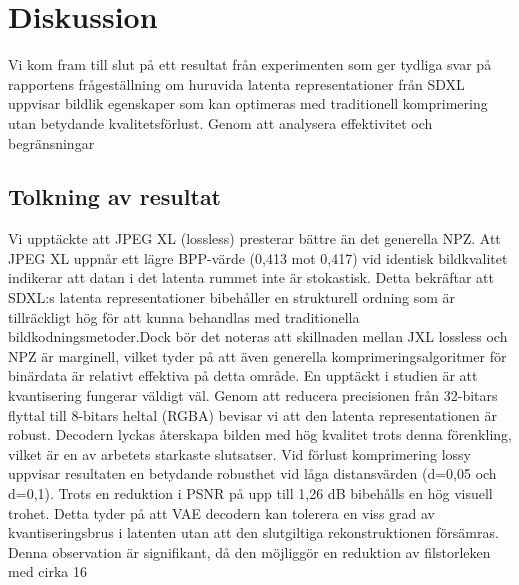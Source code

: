 \section*{Diskussion}




Vi kom fram till slut på ett resultat från experimenten som ger tydliga svar på rapportens frågeställning om huruvida latenta representationer från SDXL uppvisar bildlik egenskaper som kan optimeras med traditionell komprimering utan betydande kvalitetsförlust. Genom att analysera effektivitet och begränsningar


\subsection*{Tolkning av resultat }
Vi upptäckte att JPEG XL (lossless) presterar bättre än det generella NPZ. Att JPEG XL uppnår ett lägre BPP-värde (0,413 mot 0,417) vid identisk bildkvalitet indikerar att datan i det latenta rummet inte är stokastisk. Detta bekräftar att SDXL:s latenta representationer bibehåller en strukturell ordning som är tillräckligt hög för att kunna behandlas med traditionella bildkodningsmetoder.Dock bör det noteras att skillnaden mellan JXL lossless och NPZ är marginell, vilket tyder på att även generella komprimeringsalgoritmer för binärdata är relativt effektiva på detta område.
En upptäckt i studien är att kvantisering fungerar väldigt väl. Genom att reducera precisionen från 32-bitars flyttal till 8-bitars heltal (RGBA) bevisar vi att den latenta representationen är robust. Decodern lyckas återskapa bilden med hög kvalitet trots denna förenkling, vilket är en av arbetets starkaste slutsatser.
Vid förlust komprimering lossy uppvisar resultaten en betydande robusthet vid låga distansvärden (d=0,05 och d=0,1). Trots en reduktion i PSNR på upp till 1,26 dB bibehålls en hög visuell trohet. Detta tyder på att VAE decodern kan tolerera en viss grad av kvantiseringsbrus i latenten utan att den slutgiltiga rekonstruktionen försämras. Denna observation är signifikant, då den möjliggör en reduktion av filstorleken med cirka 16 %

